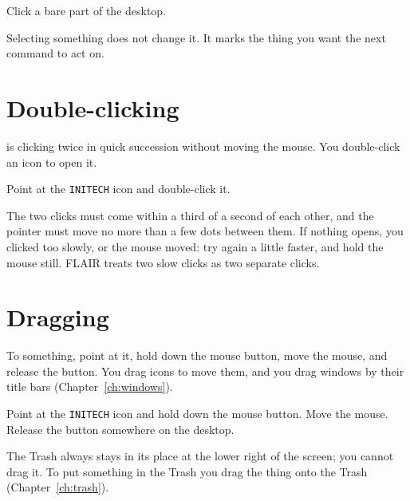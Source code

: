 
\begin{TaskSteps}[resume]
\Step Click a bare part of the desktop.
\end{TaskSteps}
Selecting something does not change it.  It marks the thing you want the
next command to act on.

\section{Double-clicking}
 is clicking twice in quick succession without moving
the mouse.  You double-click an icon to open it.
\begin{TaskSteps}
\Step Point at the \texttt{INITECH} icon and double-click it.
\end{TaskSteps}
The two clicks must come within a third of a second of each other, and the
pointer must move no more than a few dots between them.  If nothing opens,
you clicked too slowly, or the mouse moved: try again a little faster, and
hold the mouse still.  FLAIR treats two slow clicks as two separate
clicks.

\section{Dragging}
To  something, point at it, hold down the mouse button, move the
mouse, and release the button.  You drag icons to move them, and you drag
windows by their title bars (Chapter~\ref{ch:windows}).
\begin{TaskSteps}
\Step Point at the \texttt{INITECH} icon and hold down the mouse button.
\Step Move the mouse.
\Step Release the button somewhere on the desktop.
\end{TaskSteps}
The Trash always stays in its place at the lower right of the screen; you
cannot drag it.  To put something in the Trash you drag the thing onto the
Trash (Chapter~\ref{ch:trash}).


